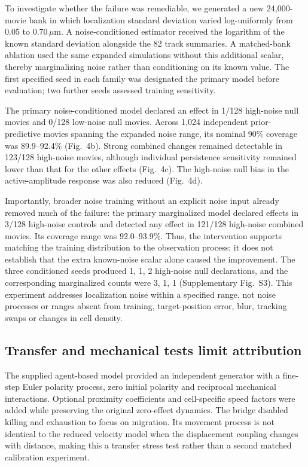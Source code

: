 \documentclass[12pt]{article}
\begin{document}
To investigate whether the failure was remediable, we generated a new 24,000-movie bank in which localization standard deviation varied log-uniformly from 0.05 to 0.70\,$\mu$m. A noise-conditioned estimator received the logarithm of the known standard deviation alongside the 82 track summaries. A matched-bank ablation used the same expanded simulations without this additional scalar, thereby marginalizing noise rather than conditioning on its known value. The first specified seed in each family was designated the primary model before evaluation; two further seeds assessed training sensitivity.

The primary noise-conditioned model declared an effect in 1/128 high-noise null movies and 0/128 low-noise null movies. Across 1,024 independent prior-predictive movies spanning the expanded noise range, its nominal 90\% coverage was 89.9--92.4\% (Fig.~4b). Strong combined changes remained detectable in 123/128 high-noise movies, although individual persistence sensitivity remained lower than that for the other effects (Fig.~4c). The high-noise null bias in the active-amplitude response was also reduced (Fig.~4d).

Importantly, broader noise training without an explicit noise input already removed much of the failure: the primary marginalized model declared effects in 3/128 high-noise controls and detected any effect in 121/128 high-noise combined movies. Its coverage range was 92.0--93.9\%. Thus, the intervention supports matching the training distribution to the observation process; it does not establish that the extra known-noise scalar alone caused the improvement. The three conditioned seeds produced 1, 1, 2 high-noise null declarations, and the corresponding marginalized counts were 3, 1, 1 (Supplementary Fig.~S3). This experiment addresses localization noise within a specified range, not noise processes or ranges absent from training, target-position error, blur, tracking swaps or changes in cell density.

\subsection*{Transfer and mechanical tests limit attribution}
The supplied agent-based model provided an independent generator with a fine-step Euler polarity process, zero initial polarity and reciprocal mechanical interactions. Optional proximity coefficients and cell-specific speed factors were added while preserving the original zero-effect dynamics. The bridge disabled killing and exhaustion to focus on migration. Its movement process is not identical to the reduced velocity model when the displacement coupling changes with distance, making this a transfer stress test rather than a second matched calibration experiment.
\end{document}
